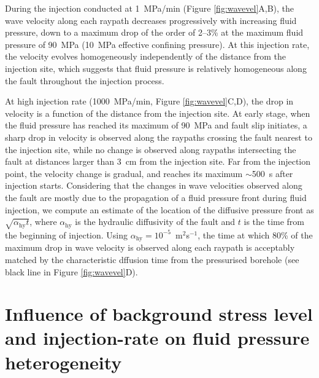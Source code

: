 \documentclass[grl]{agutex2arxiv}
\begin{document}
\begin{article}
During the injection conducted at 1~MPa/min (Figure \ref{fig:wavevel}A,B), the wave velocity along each raypath decreases progressively with increasing fluid pressure, down to a maximum drop of the order of 2--3\% at the maximum fluid pressure of 90~MPa (10~MPa effective confining pressure). At this injection rate, the velocity evolves homogeneously independently of the distance from the injection site, which suggests that fluid pressure is relatively homogeneous along the fault throughout the injection process. 

At high injection rate (1000~MPa/min, Figure \ref{fig:wavevel}C,D), the drop in velocity is a function of the distance from the injection site. At early stage, when the fluid pressure has reached its maximum of 90~MPa and fault slip initiates, a sharp drop in velocity is observed along the raypaths crossing the fault nearest to the injection site, while no change is observed along raypaths intersecting the fault at distances larger than 3~cm from the injection site. Far from the injection point, the velocity change is gradual, and reaches its maximum $\sim$500~s after injection starts. Considering that the changes in wave velocities observed along the fault are mostly due to the propagation of a fluid pressure front during fluid injection, we compute an estimate of the location of the diffusive pressure front as $\sqrt{\alpha_\mathrm{hy}t}$, where $\alpha_\mathrm{hy}$ is the hydraulic diffusivity of the fault and $t$ is the time from the beginning of injection. Using $\alpha_\mathrm{hy}=10^{-5}$~m$^2$s$^{-1}$, the time at which 80\% of the maximum drop in wave velocity is observed along each raypath is acceptably matched by the characteristic dffusion time from the pressurised borehole (see black line in Figure \ref{fig:wavevel}D).

\section{Influence of background stress level and injection-rate on fluid pressure heterogeneity}


\end{article}
\end{document}
